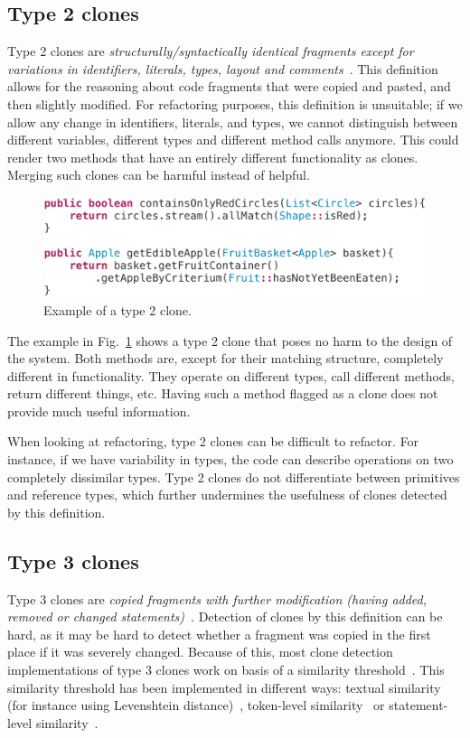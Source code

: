\documentclass[a4paper]{article}
\begin{document}
\subsection{Type 2 clones}\label{sec:type2}
Type 2 clones are \textit{structurally/syntactically identical fragments except for variations in identifiers, literals, types, layout and comments}~\cite{roy2007survey}. This definition allows for the reasoning about code fragments that were copied and pasted, and then slightly modified. For refactoring purposes, this definition is unsuitable; if we allow any change in identifiers, literals, and types, we cannot distinguish between different variables, different types and different method calls anymore. This could render two methods that have an entirely different functionality as clones. Merging such clones can be harmful instead of helpful.

\begin{figure}[H]
  \includegraphics[width=1\columnwidth]{img/type2}
  \caption{Example of a type 2 clone.}
  \label{fig:type2}
\end{figure}

The example in Fig.~\ref{fig:type2} shows a type 2 clone that poses no harm to the design of the system. Both methods are, except for their matching structure, completely different in functionality. They operate on different types, call different methods, return different things, etc. Having such a method flagged as a clone does not provide much useful information.

When looking at refactoring, type 2 clones can be difficult to refactor. For instance, if we have variability in types, the code can describe operations on two completely dissimilar types. Type 2 clones do not differentiate between primitives and reference types, which further undermines the usefulness of clones detected by this definition.

\subsection{Type 3 clones}\label{sec:type3}
Type 3 clones are \textit{copied fragments with further modification (having added, removed or changed statements)}~\cite{roy2007survey}. Detection of clones by this definition can be hard, as it may be hard to detect whether a fragment was copied in the first place if it was severely changed. Because of this, most clone detection implementations of type 3 clones work on basis of a similarity threshold~\cite{roy2008nicad,ragkhitwetsagul2019siamese,jiang2007deckard,semura2017ccfindersw}. This similarity threshold has been implemented in different ways: textual similarity (for instance using Levenshtein distance)~\cite{lavoie2011automated}, token-level similarity~\cite{sajnani2016sourcerercc} or statement-level similarity~\cite{kamalpriya2017enhancing}.
\end{document}
